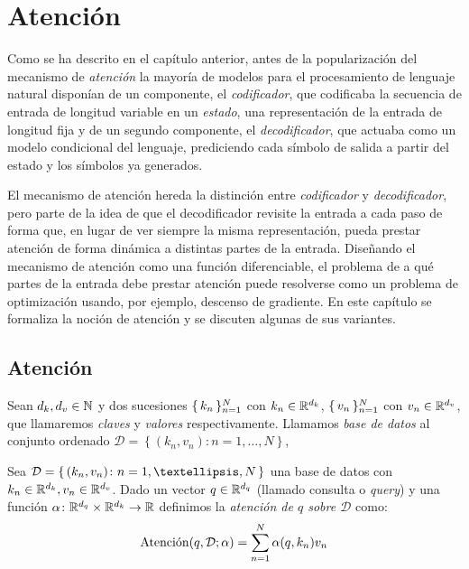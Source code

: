 \chapter{Atención}
Como se ha descrito en el capítulo anterior, antes de la popularización del mecanismo de \textit{atención} la mayoría de modelos para el procesamiento de lenguaje natural disponían de un componente, el \textit{codificador}, que codificaba la secuencia de entrada de longitud variable en un \textit{estado}, una representación de la entrada de longitud fija y de un segundo componente, el \textit{decodificador}, que actuaba como un modelo condicional del lenguaje, prediciendo cada símbolo de salida a partir del estado y los símbolos ya generados.

El mecanismo de atención hereda la distinción entre \textit{codificador} y \textit{decodificador}, pero parte de la idea de que el decodificador revisite la entrada a cada paso de forma que, en lugar de ver siempre la misma representación, pueda prestar atención de forma dinámica a distintas partes de la entrada. Diseñando el mecanismo de atención como una función diferenciable, el problema de a qué partes de la entrada debe prestar atención puede resolverse como un problema de optimización usando, por ejemplo, descenso de gradiente. En este capítulo se formaliza la noción de atención y se discuten algunas de sus variantes.

\section{Atención}

\begin{definition}
    Sean \( d_k, d_v \in \mathbb{N} \) y dos sucesiones \( \{\, k_n \,\}_{n = 1}^N \) con \( k_n \in \mathbb{R}^{d_k} \), \( \{\,v_n\,\}_{n = 1}^N \) con  \( v_n \in \mathbb{R}^{d_v} \), que llamaremos \textit{claves} y \textit{valores} respectivamente. Llamamos \textit{base de datos} al conjunto ordenado \( \mathcal{D} = \left\{ (k_n, v_n) \colon n = 1, …, N \right\} \),
\end{definition}

\begin{definition}[Atención] Sea \( \mathcal{D} = \Set{(k_n, v_n) \colon n = 1, …, N} \) una base de datos con \( k_n \in \mathbb{R}^{d_k}, v_n \in \mathbb{R}^{d_v}\). Dado un vector \( q \in \mathbb{R}^{d_q} \) (llamado consulta o \textit{query}) y una función \( \alpha \colon \mathbb{R}^{d_q} \times \mathbb{R}^{d_k} \to \mathbb{R} \) definimos la \textit{atención de \( q \) sobre \( \mathcal{D} \)} como:
\[
\operatorname{Atenci\acute{o}n}(q, \mathcal{D}; \alpha) = \sum^N_{n = 1} \alpha(q, k_n) v_n
\]
\end{definition}

